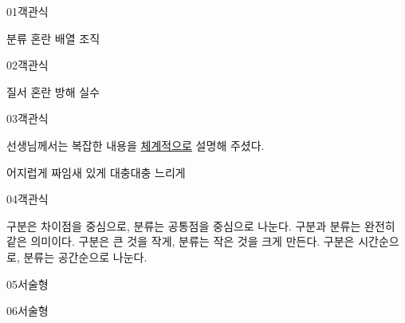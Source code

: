 \documentclass[fs11,seriesFre]{korfarm-base}
\begin{document}
\begin{kfQBlock}{01}{객관식}
\begin{kfChoices}
\kfChoice 분류
\kfChoice 혼란
\kfChoice 배열
\kfChoice 조직
\end{kfChoices}
\end{kfQBlock}
\begin{kfQBlock}{02}{객관식}
\begin{kfChoices}
\kfChoice 질서
\kfChoice 혼란
\kfChoice 방해
\kfChoice 실수
\end{kfChoices}
\end{kfQBlock}
\begin{kfQBlock}{03}{객관식}
\begin{kfEvidence}선생님께서는 복잡한 내용을 \uline{체계적으로} 설명해 주셨다.\end{kfEvidence}
\begin{kfChoices}
\kfChoice 어지럽게
\kfChoice 짜임새 있게
\kfChoice 대충대충
\kfChoice 느리게
\end{kfChoices}
\end{kfQBlock}
\begin{kfQBlock}{04}{객관식}
\begin{kfChoices}
\kfChoice 구분은 차이점을 중심으로, 분류는 공통점을 중심으로 나눈다.
\kfChoice 구분과 분류는 완전히 같은 의미이다.
\kfChoice 구분은 큰 것을 작게, 분류는 작은 것을 크게 만든다.
\kfChoice 구분은 시간순으로, 분류는 공간순으로 나눈다.
\end{kfChoices}
\end{kfQBlock}
\begin{kfQBlock}{05}{서술형}
\end{kfQBlock}
\begin{kfQBlock}{06}{서술형}
\end{kfQBlock}




\end{document}
